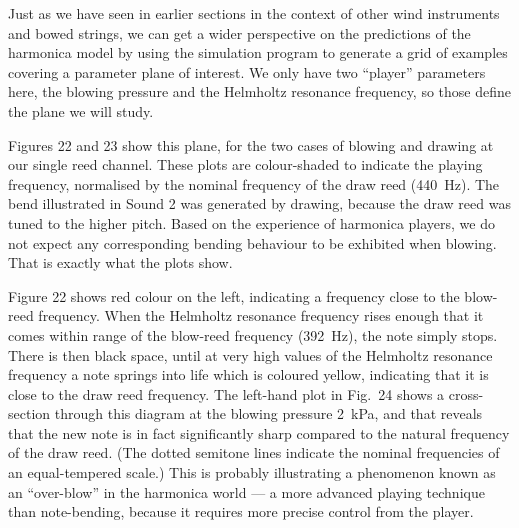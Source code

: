 
  Just as we have seen in earlier sections in the context of other wind 
  instruments and bowed strings, we can get a wider perspective on the 
  predictions of the harmonica model by using the simulation program to 
  generate a grid of examples covering a parameter plane of interest. We only 
  have two “player” parameters here, the blowing pressure and the Helmholtz 
  resonance frequency, so those define the plane we will study. 

  Figures 22 and 23 show this plane, for the two cases of blowing and drawing 
  at our single reed channel. These plots are colour-shaded to indicate the 
  playing frequency, normalised by the nominal frequency of the draw reed 
  (440~Hz). The bend illustrated in Sound 2 was generated by drawing, because 
  the draw reed was tuned to the higher pitch. Based on the experience of 
  harmonica players, we do not expect any corresponding bending behaviour to be 
  exhibited when blowing. That is exactly what the plots show. 



  Figure 22 shows red colour on the left, indicating a frequency close to the 
  blow-reed frequency. When the Helmholtz resonance frequency rises enough that 
  it comes within range of the blow-reed frequency (392~Hz), the note simply 
  stops. There is then black space, until at very high values of the Helmholtz 
  resonance frequency a note springs into life which is coloured yellow, 
  indicating that it is close to the draw reed frequency. The left-hand plot in 
  Fig.\ 24 shows a cross-section through this diagram at the blowing pressure 
  2~kPa, and that reveals that the new note is in fact significantly sharp 
  compared to the natural frequency of the draw reed. (The dotted semitone 
  lines indicate the nominal frequencies of an equal-tempered scale.) This is 
  probably illustrating a phenomenon known as an “over-blow” in the harmonica 
  world — a more advanced playing technique than note-bending, because it 
  requires more precise control from the player. 

